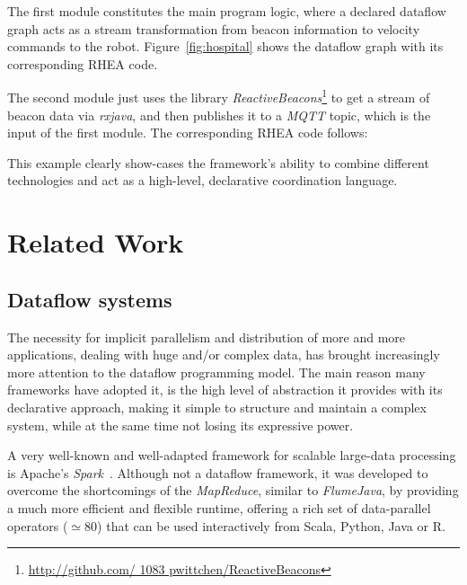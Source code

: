 \documentclass[sigplan,review,anonymous,screen]{acmart}
\begin{document}
The first module constitutes the main program logic, where a declared dataflow
graph acts as a stream transformation from beacon information to velocity
commands to the robot. Figure~\ref{fig:hospital} shows the dataflow graph with
its corresponding \textsc{RHEA} code.


The second module just uses the library \textit{ReactiveBeacons}\footnote{\url{http://github.com/ 1083 pwittchen/ReactiveBeacons}}
to get a stream of beacon data via \textit{rxjava}, and then publishes it to a \textit{MQTT} topic,
which is the input of the first module. The corresponding \textsc{RHEA} code
follows:

This example clearly show-cases the framework's ability to combine different
technologies and act as a high-level, declarative coordination language.

\section{Related Work} \label{sec:related}

\subsection{Dataflow systems}

The necessity for implicit parallelism and distribution of more and more
applications, dealing with huge and/or complex data, has brought increasingly
more attention to the dataflow programming model. The main reason many
frameworks have adopted it, is the high level of abstraction it provides with
its declarative approach, making it simple to structure and maintain a complex
system, while at the same time not losing its expressive power.

A very well-known and well-adapted framework for scalable large-data processing
is Apache's \textit{Spark}~\cite{spark}. Although not a
dataflow framework, it was developed to overcome the shortcomings of the
\textit{MapReduce}, similar to \textit{FlumeJava}, by providing a much more
efficient and flexible runtime, offering a rich set of data-parallel operators ($\simeq 80$)
that can be used interactively from Scala, Python, Java or R.
\end{document}
